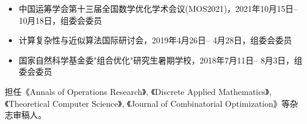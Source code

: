 %
%


{
\fontsize{9.5pt}{\baselineskip}\selectfont

\begin{itemize}[leftmargin=*]
	\item 中国运筹学会第十三届全国数学优化学术会议(MOS2021)，2021年10月15日-- 10月18日，组委会委员
	\item 计算复杂性与近似算法国际研讨会，2019年4月26日-- 4月28日，组委会委员
	\item 国家自然科学基金委"组合优化"研究生暑期学校，2018年7月11日-- 8月3日，组委会委员
\end{itemize}

担任《Annals of Operations Research》, 《Discrete Applied Mathematics》, 《Theoretical Computer Science》, 《Journal of Combinatorial Optimization》等杂志审稿人。
}